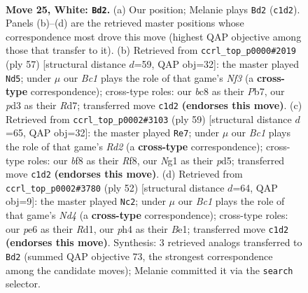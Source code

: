 \documentclass[11pt]{article}
\begin{document}
\clearpage

\begin{figure}[p]\centering
\begin{subfigure}{0.46\textwidth}\centering
\resizebox{\linewidth}{!}{%
\newchessgame
\chessboard[
  setfen={r1b1kbr1/5p2/4p3/4n1P1/p6p/P2p4/R5PP/1KB2NNR w q - 2 25},
  showmover=false,
  pgfstyle=straightmove, color=movearrow, markmove={c1-d2}
]}
\caption{}
\end{subfigure}\hfill
\begin{subfigure}{0.46\textwidth}\centering
\resizebox{\linewidth}{!}{%
\newchessgame
\chessboard[
  setfen={r7/1p1rbk2/2p2np1/5p2/p7/4PB1P/PPR2P2/1R2B1K1 b - - 5 29},
  showmover=false,
  pgfstyle=straightmove, color=movearrow, markmove={f6-d5}
]}
\caption{}
\end{subfigure}
\\[4pt]
\begin{subfigure}{0.46\textwidth}\centering
\resizebox{\linewidth}{!}{%
\newchessgame
\chessboard[
  setfen={1kb2r2/p2r3p/1p1n2p1/2pP4/6PR/1PN2P2/P3B3/2K1R3 b - - 16 30},
  showmover=false,
  pgfstyle=straightmove, color=movearrow, markmove={d7-e7}
]}
\caption{}
\end{subfigure}\hfill
\begin{subfigure}{0.46\textwidth}\centering
\resizebox{\linewidth}{!}{%
\newchessgame
\chessboard[
  setfen={1r4k1/5p1p/r5p1/p1np4/1b1N4/1P6/P4PPP/3RBRK1 w - - 0 27},
  showmover=false,
  pgfstyle=straightmove, color=movearrow, markmove={d4-c2}
]}
\caption{}
\end{subfigure}
\caption{\textbf{Move 25, White: \texttt{Bd2}.} (a) Our position; Melanie plays \texttt{Bd2} (\texttt{c1d2}). Panels (b)--(d) are the retrieved master positions whose correspondence most drove this move (highest QAP objective among those that transfer to it). (b) Retrieved from \texttt{ccrl\_top\_p0000\#2019} (ply 57) [structural distance $d$=59, QAP obj=32]: the master played \texttt{Nd5}; under $\mu$ our \emph{Bc1} plays the role of that game's \emph{Nf3} (a \textbf{cross-type} correspondence); cross-type roles: our \emph{b}c8 as their \emph{P}b7, our \emph{p}d3 as their \emph{R}d7; transferred move \texttt{c1d2} \textbf{(endorses this move)}. (c) Retrieved from \texttt{ccrl\_top\_p0002\#3103} (ply 59) [structural distance $d$=65, QAP obj=32]: the master played \texttt{Re7}; under $\mu$ our \emph{Bc1} plays the role of that game's \emph{Rd2} (a \textbf{cross-type} correspondence); cross-type roles: our \emph{b}f8 as their \emph{R}f8, our \emph{N}g1 as their \emph{p}d5; transferred move \texttt{c1d2} \textbf{(endorses this move)}. (d) Retrieved from \texttt{ccrl\_top\_p0002\#3780} (ply 52) [structural distance $d$=64, QAP obj=9]: the master played \texttt{Nc2}; under $\mu$ our \emph{Bc1} plays the role of that game's \emph{Nd4} (a \textbf{cross-type} correspondence); cross-type roles: our \emph{p}e6 as their \emph{R}d1, our \emph{p}h4 as their \emph{B}e1; transferred move \texttt{c1d2} \textbf{(endorses this move)}. Synthesis: 3 retrieved analogs transferred to \texttt{Bd2} (summed QAP objective 73, the strongest correspondence among the candidate moves); Melanie committed it via the \texttt{search} selector.}
\label{fig:thought-m48}
\end{figure}
\end{document}
